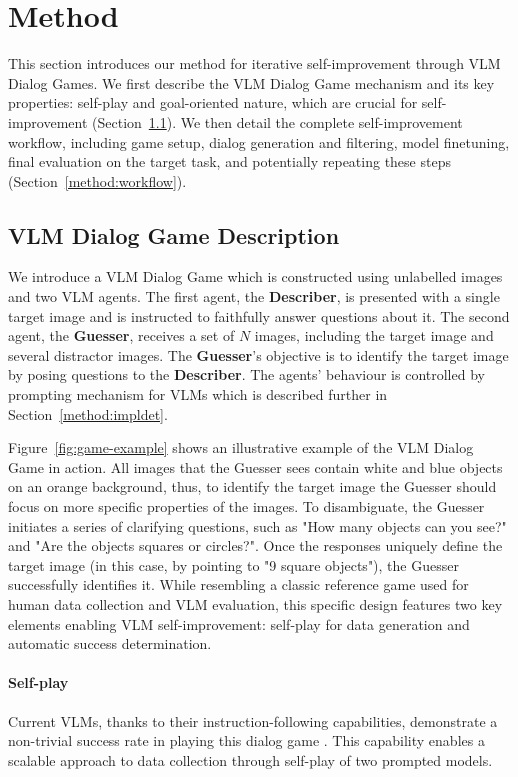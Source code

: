 \section{Method}
\label{sec:method}

This section introduces our method for iterative self-improvement through VLM Dialog Games.
We first describe the VLM Dialog Game mechanism and its key properties: self-play and goal-oriented nature, which are crucial for self-improvement (Section~\ref{method:game-desc}).
We then detail the complete self-improvement workflow, including game setup, dialog generation and filtering, model finetuning, final evaluation on the target task, and potentially repeating these steps (Section~\ref{method:workflow}).

\subsection{VLM Dialog Game Description}
\label{method:game-desc}

We introduce a VLM Dialog Game which is constructed using unlabelled images and two VLM agents.
The first agent, the \textbf{Describer}, is presented with a single target image and is instructed to faithfully answer questions about it. 
The second agent, the \textbf{Guesser}, receives a set of $N$ images, including the target image and several distractor images.
The \textbf{Guesser}'s objective is to identify the target image by posing questions to the \textbf{Describer}.
The agents' behaviour is controlled by prompting mechanism for VLMs which is described further in Section~\ref{method:impldet}.

Figure~\ref{fig:game-example} shows an illustrative example of the VLM Dialog Game in action. 
All images that the Guesser sees contain white and blue objects on an orange background, thus, to identify the target image the Guesser should focus on more specific properties of the images.
To disambiguate, the Guesser initiates a series of clarifying questions, such as "How many objects can you see?" and "Are the objects squares or circles?".
Once the responses uniquely define the target image (in this case, by pointing to "\num{9} square objects"), the Guesser successfully identifies it.
While resembling a classic reference game used for human data collection and VLM evaluation, this specific design features two key elements enabling VLM self-improvement: self-play for data generation and automatic success determination.

\paragraph{Self-play}
Current VLMs, thanks to their instruction-following capabilities, demonstrate a non-trivial success rate in playing this dialog game \citep{hakimov2024usinggameplayinvestigate}.
This capability enables a scalable approach to data collection through self-play of two prompted models.

